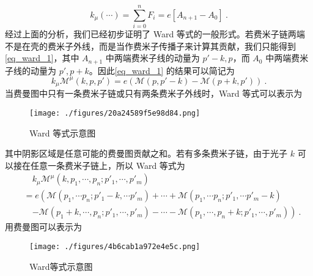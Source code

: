 \begin{equation}\label{eq_ward_1}
k_\mu (\cdots) = \sum_{i=0}^n F_i = e[A_{n+1}-A_0]~.
\end{equation}
经过上面的分析，我们已经初步证明了 Ward 等式的一般形式。若费米子链两端不是在壳的费米子外线，而是当作费米子传播子来计算其贡献，我们只能得到\autoref{eq_ward_1}，其中 $A_{n+1}$ 中两端费米子线的动量为 $p'-k,p$，而 $A_{0}$ 中两端费米子线的动量为 $p',p+k$。因此\autoref{eq_ward_1} 的结果可以简记为
\begin{equation}\label{eq_ward_3}
k_\mu\mathcal{M}^\mu(k,p,p') = e(\mathcal{M}(p,p'-k)-\mathcal{M}(p+k,p'))~.
\end{equation}
当费曼图中只有一条费米子链或只有两条费米子外线时，Ward 等式可以表示为
\begin{figure}[ht]
\centering
\texttt{[image: ./figures/20a24589f5e98d84.png]}
\caption{Ward 等式示意图} \label{fig_ward_5}
\end{figure}
其中阴影区域是任意可能的费曼图贡献之和。若有多条费米子链，由于光子 $k$ 可以接在任意一条费米子链上，所以 Ward 等式为
\begin{equation}\label{eq_ward_2}
\begin{aligned}
& \quad k_\mu\mathcal{M}^\mu(k,p_1,\cdots,p_n;p'_1,\cdots,p'_m) \\
& = e\left(
\mathcal{M}(p_1,\cdots p_n;p'_1-k,\cdots p'_m)+\cdots+\mathcal{M}(p_1,\cdots p_n;p'_1,\cdots p'_m-k)
\right.
\\
&\quad \left.-\mathcal{M}(p_1+k,\cdots,p_n;p'_1,\cdots,p'_m)-\cdots-\mathcal{M}(p_1,\cdots,p_n+k;p'_1,\cdots,p'_m)
\right)~.
\end{aligned}
\end{equation}
用费曼图可以表示为
\begin{figure}[ht]
\centering
\texttt{[image: ./figures/4b6cab1a972e4e5c.png]}
\caption{Ward等式示意图} \label{fig_ward_7}
\end{figure}
